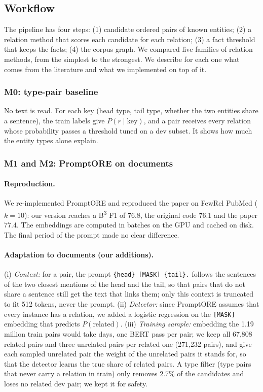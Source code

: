 \documentclass[pdflatex,sn-mathphys-num]{sn-jnl}
\begin{document}
\subsection{Workflow}\label{sec:workflow}

The pipeline has four steps: (1) candidate ordered pairs of known entities; (2) a relation method that scores each candidate for each relation; (3) a fact threshold that keeps the facts; (4) the corpus graph. We compared five families of relation methods, from the simplest to the strongest. We describe for each one what comes from the literature and what we implemented on top of it.

\subsubsection{M0: type-pair baseline}
No text is read. For each key (head type, tail type, whether the two entities share a sentence), the train labels give $P(r \mid \text{key})$, and a pair receives every relation whose probability passes a threshold tuned on a dev subset. It shows how much the entity types alone explain.

\subsubsection{M1 and M2: PromptORE on documents}\label{sec:promptore}

\paragraph{Reproduction.} We re-implemented PromptORE and reproduced the paper on FewRel PubMed ($k=10$): our version reaches a B\textsuperscript{3} F1 of 76.8, the original code 76.1 and the paper 77.4. The embeddings are computed in batches on the GPU and cached on disk. The final period of the prompt made no clear difference.

\paragraph{Adaptation to documents (our additions).} (i) \emph{Context:} for a pair, the prompt \texttt{\{head\} [MASK] \{tail\}.} follows the sentences of the two closest mentions of the head and the tail, so that pairs that do not share a sentence still get the text that links them; only this context is truncated to fit 512 tokens, never the prompt. (ii) \emph{Detector:} since PromptORE assumes that every instance has a relation, we added a logistic regression on the \texttt{[MASK]} embedding that predicts $P(\text{related})$. (iii) \emph{Training sample:} embedding the 1.19 million train pairs would take days, one BERT pass per pair; we keep all 67,808 related pairs and three unrelated pairs per related one (271,232 pairs), and give each sampled unrelated pair the weight of the unrelated pairs it stands for, so that the detector learns the true share of related pairs. A type filter (type pairs that never carry a relation in train) only removes 2.7\% of the candidates and loses no related dev pair; we kept it for safety.
\end{document}
